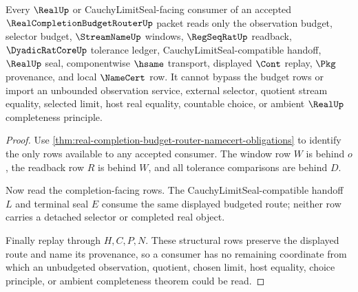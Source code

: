 \begin{theorem}
\label{thm:real-completion-budget-router-nonescape}
Every $\RealUp$ or CauchyLimitSeal-facing consumer of an accepted $\RealCompletionBudgetRouterUp$ packet reads only the observation budget, selector budget, $\StreamNameUp$ windows, $\RegSeqRatUp$ readback, $\DyadicRatCoreUp$ tolerance ledger, CauchyLimitSeal-compatible handoff, $\RealUp$ seal, componentwise $\hsame$ transport, displayed $\Cont$ replay, $\Pkg$ provenance, and local $\NameCert$ row. It cannot bypass the budget rows or import an unbounded observation service, external selector, quotient stream equality, selected limit, host real equality, countable choice, or ambient $\RealUp$ completeness principle.
\end{theorem}
\begin{proof}
Use \autoref{thm:real-completion-budget-router-namecert-obligations} to identify the only rows available to any accepted consumer. The window row $W$ is behind $o$, the readback row $R$ is behind $W$, and all tolerance comparisons are behind $D$.

Now read the completion-facing rows. The CauchyLimitSeal-compatible handoff $L$ and terminal seal $E$ consume the same displayed budgeted route; neither row carries a detached selector or completed real object.

Finally replay through $H,C,P,N$. These structural rows preserve the displayed route and name its provenance, so a consumer has no remaining coordinate from which an unbudgeted observation, quotient, chosen limit, host equality, choice principle, or ambient completeness theorem could be read.
\end{proof}



